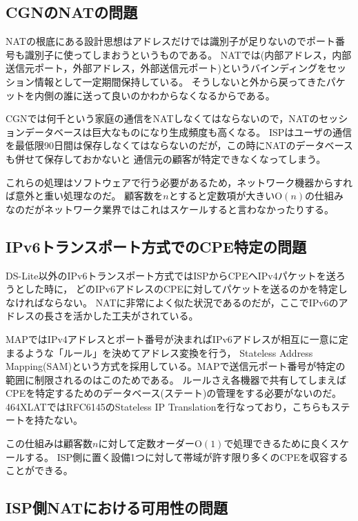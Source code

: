 \subsection{CGNのNATの問題}

NATの根底にある設計思想はアドレスだけでは識別子が足りないのでポート番号も識別子に使ってしまおうというものである。
NATでは(内部アドレス，内部送信元ポート，外部アドレス，外部送信元ポート)というバインディングをセッション情報として一定期間保持している。
そうしないと外から戻ってきたパケットを内側の誰に送って良いのかわからなくなるからである。

CGNでは何千という家庭の通信をNATしなくてはならないので，NATのセッションデータベースは巨大なものになり生成頻度も高くなる。
ISPはユーザの通信を最低限90日間は保存しなくてはならないのだが，この時にNATのデータベースも併せて保存しておかないと
通信元の顧客が特定できなくなってしまう。

これらの処理はソフトウェアで行う必要があるため，ネットワーク機器からすれば意外と重い処理なのだ。
顧客数を$n$とすると定数項が大きい$\mathrm{O}(n)$の仕組みなのだがネットワーク業界ではこれはスケールすると言わなかったりする。

\subsection{IPv6トランスポート方式でのCPE特定の問題}

DS-Lite以外のIPv6トランスポート方式ではISPからCPEへIPv4パケットを送ろうとした時に，
どのIPv6アドレスのCPEに対してパケットを送るのかを特定しなければならない。
NATに非常によく似た状況であるのだが，ここでIPv6のアドレスの長さを活かした工夫がされている。

MAPではIPv4アドレスとポート番号が決まればIPv6アドレスが相互に一意に定まるような「ルール」を決めてアドレス変換を行う，
Stateless Address Mapping(SAM)という方式を採用している。MAPで送信元ポート番号が特定の範囲に制限されるのはこのためである。
ルールさえ各機器で共有してしまえばCPEを特定するためのデータベース(ステート)の管理をする必要がないのだ。
464XLATではRFC6145のStateless IP Translationを行なっており，こちらもステートを持たない。

この仕組みは顧客数$n$に対して定数オーダー$\mathrm{O}(1)$で処理できるために良くスケールする。
ISP側に置く設備1つに対して帯域が許す限り多くのCPEを収容することができる。

\subsection{ISP側NATにおける可用性の問題}

